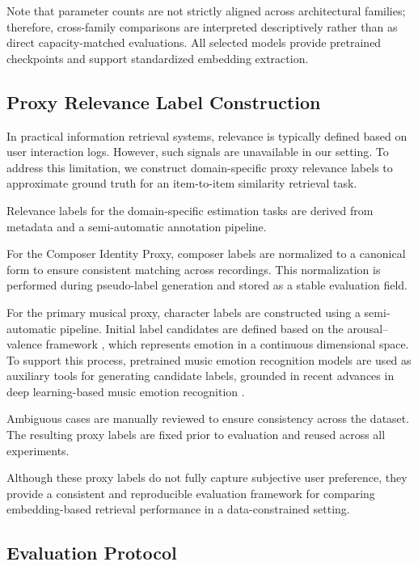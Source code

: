 \documentclass[sigconf]{acmart}
\begin{document}
Note that parameter counts are not strictly aligned across architectural families; therefore, cross-family comparisons are interpreted descriptively rather than as direct capacity-matched evaluations. All selected models provide pretrained checkpoints and support standardized embedding extraction.


\subsection{Proxy Relevance Label Construction}

In practical information retrieval systems, relevance is typically defined based on user interaction logs. However, such signals are unavailable in our setting. To address this limitation, we construct domain-specific proxy relevance labels to approximate ground truth for an item-to-item similarity retrieval task.

Relevance labels for the domain-specific estimation tasks are derived from metadata and a semi-automatic annotation pipeline.

For the Composer Identity Proxy, composer labels are normalized to a canonical form to ensure consistent matching across recordings. This normalization is performed during pseudo-label generation and stored as a stable evaluation field.

For the primary musical proxy, character labels are constructed using a semi-automatic pipeline. Initial label candidates are defined based on the arousal--valence framework \cite{eerola2011}, which represents emotion in a continuous dimensional space. To support this process, pretrained music emotion recognition models are used as auxiliary tools for generating candidate labels, grounded in recent advances in deep learning-based music emotion recognition \cite{jiang2024}.

Ambiguous cases are manually reviewed to ensure consistency across the dataset. The resulting proxy labels are fixed prior to evaluation and reused across all experiments.

Although these proxy labels do not fully capture subjective user preference, they provide a consistent and reproducible evaluation framework for comparing embedding-based retrieval performance in a data-constrained setting.




\subsection{Evaluation Protocol}
\end{document}
